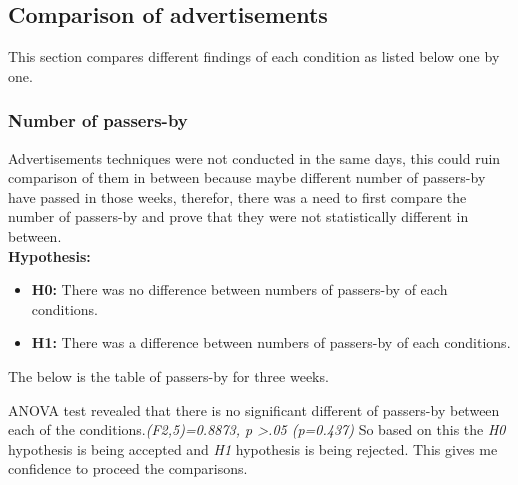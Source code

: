 \newpage
\subsection{Comparison of advertisements}
This section compares different findings of each condition as listed below one by one. 

\subsubsection {Number of passers-by}
Advertisements techniques were not conducted in the same days, this could ruin comparison of them in between because maybe different number of passers-by have passed in those weeks, therefor, there was a need to first compare the number of passers-by and prove that they were not statistically different in between. \\

\textbf{Hypothesis:}
\begin{itemize}
\item \textbf{H0:} There was no difference between numbers of passers-by of each conditions.
\item \textbf{H1:} There was a difference between numbers of passers-by of each conditions.
\end{itemize}

The below is the table of passers-by for three weeks.

\begin{table}[H]
\caption{Number of passers-by in three weeks}
\label{tab:passerbyofthreeweeks}
\centering
{}
\end{table}

ANOVA test revealed that there is no significant different of passers-by between each of the conditions.\emph{(F2,5)=0.8873, p >.05 (p=0.437)}
So based on this the \emph{H0} hypothesis is being accepted and \emph{H1} hypothesis is being rejected. This gives me confidence to proceed the comparisons.

